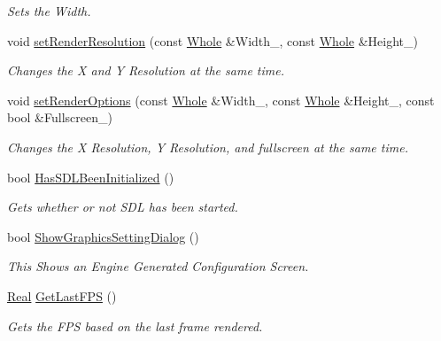 \begin{DoxyCompactItemize}
\begin{DoxyCompactList}\small\item\em Sets the Width. \item\end{DoxyCompactList}\item 
void \hyperlink{classphys_1_1GraphicsManager_ac6feb044d9ab394f3e65d51026a899a6}{setRenderResolution} (const \hyperlink{namespacephys_a460f6bc24c8dd347b05e0366ae34f34a}{Whole} \&Width\_\-, const \hyperlink{namespacephys_a460f6bc24c8dd347b05e0366ae34f34a}{Whole} \&Height\_\-)
\begin{DoxyCompactList}\small\item\em Changes the X and Y Resolution at the same time. \item\end{DoxyCompactList}\item 
void \hyperlink{classphys_1_1GraphicsManager_ab3eff6a622e84cc1e567ca3887248010}{setRenderOptions} (const \hyperlink{namespacephys_a460f6bc24c8dd347b05e0366ae34f34a}{Whole} \&Width\_\-, const \hyperlink{namespacephys_a460f6bc24c8dd347b05e0366ae34f34a}{Whole} \&Height\_\-, const bool \&Fullscreen\_\-)
\begin{DoxyCompactList}\small\item\em Changes the X Resolution, Y Resolution, and fullscreen at the same time. \item\end{DoxyCompactList}\item 
bool \hyperlink{classphys_1_1GraphicsManager_ad07600281c765e22bc413a1a9df1a22c}{HasSDLBeenInitialized} ()
\begin{DoxyCompactList}\small\item\em Gets whether or not SDL has been started. \item\end{DoxyCompactList}\item 
bool \hyperlink{classphys_1_1GraphicsManager_adcded385b6442aa5da6097f1edd5471a}{ShowGraphicsSettingDialog} ()
\begin{DoxyCompactList}\small\item\em This Shows an Engine Generated Configuration Screen. \item\end{DoxyCompactList}\item 
\hyperlink{namespacephys_af7eb897198d265b8e868f45240230d5f}{Real} \hyperlink{classphys_1_1GraphicsManager_ac1b8450e3cb7d83d0414322fcf403421}{GetLastFPS} ()
\begin{DoxyCompactList}\small\item\em Gets the FPS based on the last frame rendered. \item\end{DoxyCompactList}\item 

\end{DoxyCompactItemize}
